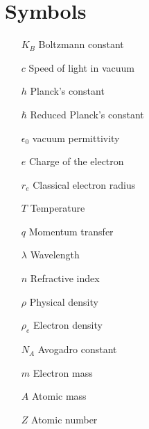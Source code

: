 \section*{Symbols}

\thispagestyle{empty}


\begin{itemize}
        \item[$K_B$] Boltzmann constant
        \item[$c$] Speed of light in vacuum        
        \item[$h$] Planck's constant  
        \item[$\hbar$] Reduced Planck's constant  
        \item[$\epsilon_0$] vacuum permittivity 
        \item[$e$] Charge of the electron  
        \item[$r_e$] Classical electron radius  
        \item[$T$] Temperature  
        \item[$q$] Momentum transfer  
        \item[$\lambda$] Wavelength  
        \item[$n$] Refractive index
        \item[$\rho$] Physical density  
        \item[$\rho_e$] Electron density
        \item[$N_A$] Avogadro constant
        \item[$m$] Electron mass
        \item[$A$] Atomic mass
        \item[$Z$] Atomic number
\end{itemize}


